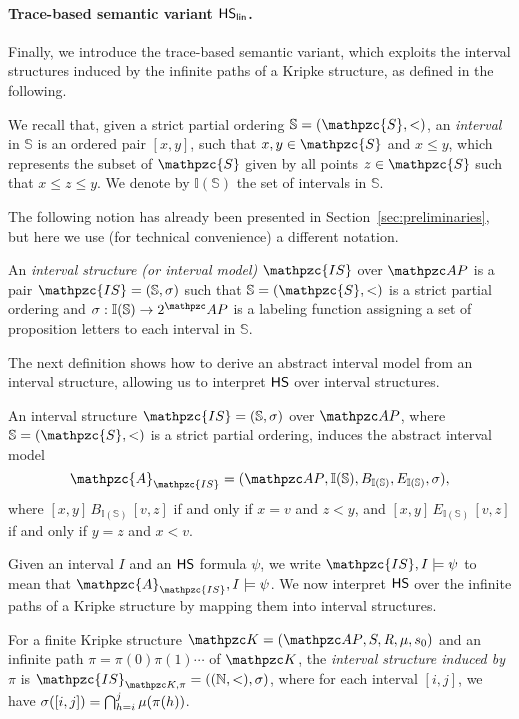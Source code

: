 \paragraph*{Trace-based semantic variant $\text{\sffamily HS}_{\mathsf{lin}}$.}
Finally, we introduce the trace-based semantic variant, which exploits the interval structures induced by the infinite paths of a Kripke structure, as defined in the following.

We recall that,
given a strict partial ordering $\mathbb{S}=(\mathpzc{S},<)$, an \emph{interval} in $\mathbb{S}$ is an ordered pair
$[x,y]$, such that $x,y\in \mathpzc{S}$ and $x\leq y$, which represents the subset of $\mathpzc{S}$ given by all points $z\in \mathpzc{S}$ such
that $x\leq z\leq y$. We denote by $\mathbb{I}(\mathbb{S})$ the set of intervals in $\mathbb{S}$.

The following notion has already been presented in Section~\ref{sec:preliminaries}, but here we use (for technical convenience) a different notation.
\begin{definition}
An \emph{interval structure (or interval model)} $\mathpzc{IS}$ over  $\Prop$ is a pair $\mathpzc{IS}=(\mathbb{S},\sigma)$ such that $\mathbb{S}=(\mathpzc{S},<)$ is a strict partial ordering
and $\sigma: \mathbb{I}(\mathbb{S}) \to 2^\Prop$ is a labeling function assigning a set of proposition letters
to each interval in $\mathbb{S}$.
\end{definition}

The next definition shows how to derive an abstract interval model from an interval structure,
allowing us to interpret $\text{\sffamily HS}$ over interval structures.

\begin{definition} 
An interval structure 
$\mathpzc{IS}=(\mathbb{S},\sigma)$ over $\Prop$, where $\mathbb{S}=(\mathpzc{S},<)$ is a strict partial ordering, induces the abstract interval model
\[
\mathpzc{A}_{\mathpzc{IS}}=(\Prop,\mathbb{I}(\mathbb{S}), B_{\mathbb{I}(\mathbb{S})},E_{\mathbb{I}(\mathbb{S})},\sigma),
\]
where
 $[x,y] \, B_{\mathbb{I}(\mathbb{S})}\, [v,z]$ if and only if $x=v$ and $z<y$, and
 $[x,y] \, E_{\mathbb{I}(\mathbb{S})}\, [v,z]$ if and only if $y=z$ and $x<v$.
\end{definition}
%
Given an interval $I$ and an $\text{\sffamily HS}$ formula $\psi$, we write $\mathpzc{IS},I\models \psi$ to mean that $\mathpzc{A}_{\mathpzc{IS}},I\models \psi$.
%
We now interpret $\text{\sffamily HS}$ over the infinite paths of a Kripke structure by mapping them into interval structures.
\begin{definition}\label{def:inducedPathIntervalStructure}
For a finite  Kripke structure $\Ku=\KuDef$ and an infinite path $\pi=\pi(0)\pi(1)\cdots$ of $\Ku$,
the \emph{interval structure induced by $\pi$} is
$\mathpzc{IS}_{\Ku,\pi}=((\Nat,<),\sigma)$, where
 for each interval $[i,j]$, we have  $\sigma([i,j])=\bigcap_{h=i}^{j}\mu(\pi(h))$.
\end{definition}

